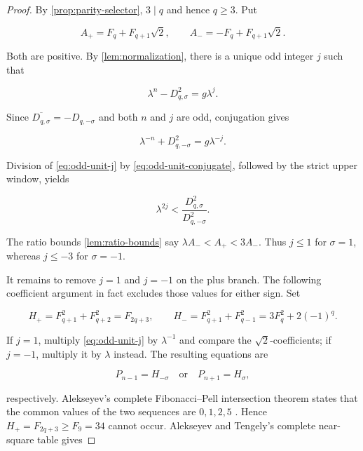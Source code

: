 \begin{proof}
By \cref{prop:parity-selector}, $3\mid q$ and hence $q\geqslant3$. Put

\begin{equation}
 A_+=F_q+F_{q+1}\sqrt2,
 \qquad
 A_-=-F_q+F_{q+1}\sqrt2.
 \label{eq:odd-Apm}
\end{equation}

Both are positive. By \cref{lem:normalization}, there is a unique odd
integer $j$ such that

\begin{equation}
 \lambda^n-D_{q,\sigma}^2=g\lambda^j.
 \label{eq:odd-unit-j}
\end{equation}

Since $\overline{D_{q,\sigma}}=-D_{q,-\sigma}$ and both $n$ and $j$ are
odd, conjugation gives

\begin{equation}
 \lambda^{-n}+D_{q,-\sigma}^2=g\lambda^{-j}.
 \label{eq:odd-unit-conjugate}
\end{equation}

Division of \cref{eq:odd-unit-j} by
\cref{eq:odd-unit-conjugate}, followed by the strict upper window, yields

\begin{equation}
 \lambda^{2j}
 <\frac{D_{q,\sigma}^2}{D_{q,-\sigma}^2}.
 \label{eq:odd-j-ratio}
\end{equation}

The ratio bounds \cref{lem:ratio-bounds} say
$\lambda A_-<A_+<3A_-$. Thus $j\leqslant1$ for $\sigma=1$, whereas
$j\leqslant-3$ for $\sigma=-1$.

It remains to remove $j=1$ and $j=-1$ on the plus branch. The following
coefficient argument in fact excludes those values for either sign. Set

\begin{equation}
 H_+=F_{q+1}^2+F_{q+2}^2=F_{2q+3},
 \qquad
 H_-=F_{q+1}^2+F_{q-1}^2
 =3F_q^2+2(-1)^q.
 \label{eq:odd-seed-heights}
\end{equation}

If $j=1$, multiply \cref{eq:odd-unit-j} by $\lambda^{-1}$ and compare
the $\sqrt2$-coefficients; if $j=-1$, multiply it by $\lambda$ instead.
The resulting equations are

\begin{equation}
 P_{n-1}=H_{-\sigma}
 \quad\text{or}\quad
 P_{n+1}=H_\sigma,
 \label{eq:odd-leading-intersections}
\end{equation}

respectively. Alekseyev's complete Fibonacci--Pell intersection theorem
states that the common values of the two sequences are $0,1,2,5$
\cite[Theorem~9]{Alekseyev2011}. Hence $H_+=F_{2q+3}\geqslant F_9=34$
cannot occur. Alekseyev and Tengely's complete near-square table gives


\end{proof}
